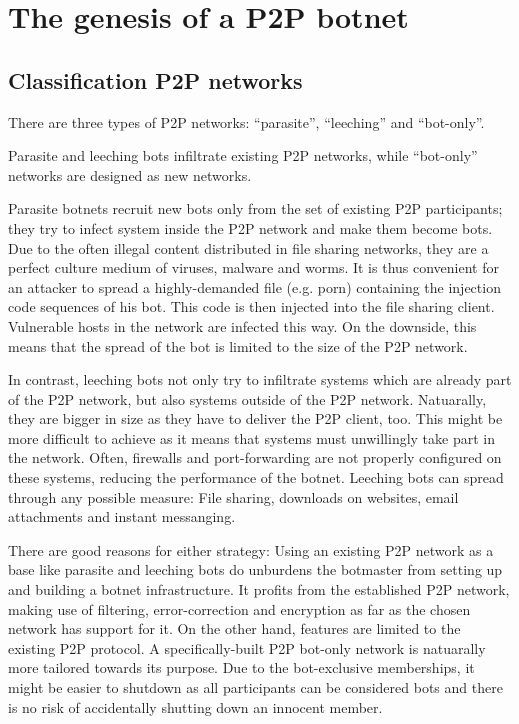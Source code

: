\documentclass{llncs}
\begin{document}
\section{The genesis of a P2P botnet}


\subsection{Classification P2P networks}
\label{ClassificP2P}
There are three types of P2P networks: ``parasite'', ``leeching'' and
``bot-only''.\cite{wang2009systematic} 

Parasite and leeching bots infiltrate existing P2P networks, while
``bot-only'' networks are designed as new networks. 

Parasite botnets recruit new bots only from the set of existing P2P
participants; they try to infect system inside the P2P network and
make them become bots. Due to the often illegal content distributed in
file sharing networks, they are a perfect culture medium of viruses,
malware and worms. It is thus convenient for an attacker to spread a
highly-demanded file (e.g. porn) containing the injection code
sequences of his bot. This code is then injected into the file sharing
client. Vulnerable hosts in the network are infected this way. On the
downside, this means that the spread of the bot is limited to the size
of the P2P network.

In contrast, leeching bots not only try to infiltrate systems which
are already part of the P2P network, but also systems outside of the
P2P network. Natuarally, they are bigger in size as they have to
deliver the P2P client, too. This might be more difficult to achieve
as it means that systems must unwillingly take part in the
network. Often, firewalls and port-forwarding are not properly
configured on these systems, reducing the performance of the
botnet. Leeching bots can spread through any possible measure: File
sharing, downloads on websites, email attachments and instant
messanging.

There are good reasons for either strategy: Using an existing P2P
network as a base like parasite and leeching bots do unburdens the
botmaster from setting up and building a botnet infrastructure. It
profits from the established P2P network, making use of filtering,
error-correction and encryption as far as the chosen network has
support for it. On the other hand, features are limited to the
existing P2P protocol. A specifically-built P2P bot-only network is
natuarally more tailored towards its purpose. Due to the bot-exclusive
memberships, it might be easier to shutdown as all participants can be
considered bots and there is no risk of accidentally shutting down an
innocent member.
\end{document}
